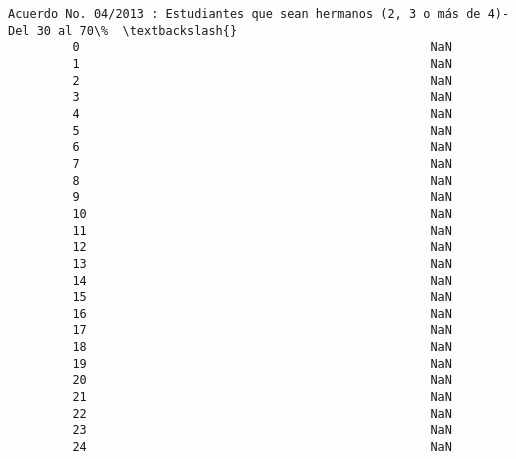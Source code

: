 \documentclass[11pt]{article}
\begin{document}
\begin{Verbatim}[commandchars=\\\{\}]
             Acuerdo No. 04/2013 : Estudiantes que sean hermanos (2, 3 o más de 4)-Del 30 al 70\%  \textbackslash{}
         0                                                 NaN                                     
         1                                                 NaN                                     
         2                                                 NaN                                     
         3                                                 NaN                                     
         4                                                 NaN                                     
         5                                                 NaN                                     
         6                                                 NaN                                     
         7                                                 NaN                                     
         8                                                 NaN                                     
         9                                                 NaN                                     
         10                                                NaN                                     
         11                                                NaN                                     
         12                                                NaN                                     
         13                                                NaN                                     
         14                                                NaN                                     
         15                                                NaN                                     
         16                                                NaN                                     
         17                                                NaN                                     
         18                                                NaN                                     
         19                                                NaN                                     
         20                                                NaN                                     
         21                                                NaN                                     
         22                                                NaN                                     
         23                                                NaN                                     
         24                                                NaN                                     

\end{Verbatim}
\end{document}
